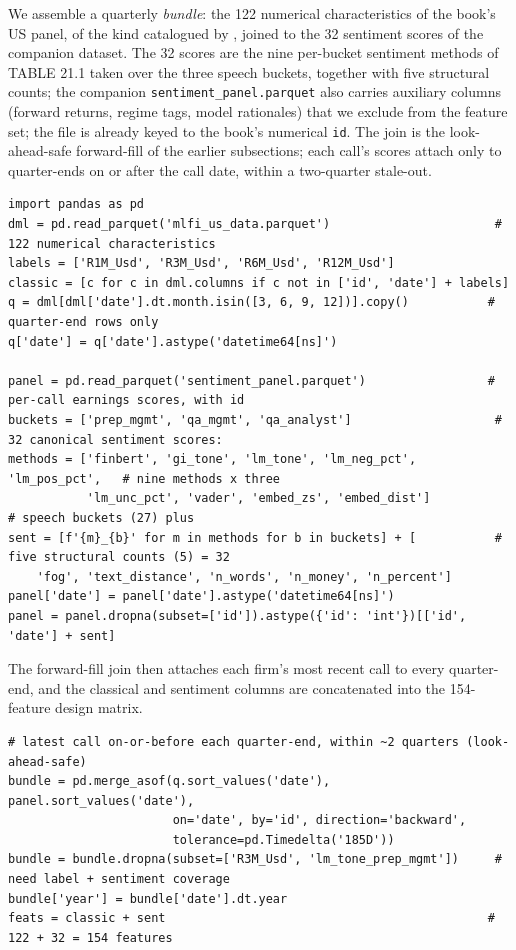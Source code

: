 We assemble a quarterly \textit{bundle}: the 122 numerical characteristics of the book's US panel, of the kind catalogued by \cite{chen2021open}, joined to the 32 sentiment scores of the companion dataset. The 32 scores are the nine per-bucket sentiment methods of TABLE 21.1 taken over the three speech buckets, together with five structural counts; the companion \texttt{sentiment\_panel.parquet} also carries auxiliary columns (forward returns, regime tags, model rationales) that we exclude from the feature set; the file is already keyed to the book's numerical \texttt{id}. The join is the look-ahead-safe forward-fill of the earlier subsections; each call's scores attach only to quarter-ends on or after the call date, within a two-quarter stale-out.

\begin{verbatim}
import pandas as pd
dml = pd.read_parquet('mlfi_us_data.parquet')                       # 122 numerical characteristics
labels = ['R1M_Usd', 'R3M_Usd', 'R6M_Usd', 'R12M_Usd']
classic = [c for c in dml.columns if c not in ['id', 'date'] + labels]
q = dml[dml['date'].dt.month.isin([3, 6, 9, 12])].copy()           # quarter-end rows only
q['date'] = q['date'].astype('datetime64[ns]')

panel = pd.read_parquet('sentiment_panel.parquet')                 # per-call earnings scores, with id
buckets = ['prep_mgmt', 'qa_mgmt', 'qa_analyst']                    # 32 canonical sentiment scores:
methods = ['finbert', 'gi_tone', 'lm_tone', 'lm_neg_pct', 'lm_pos_pct',   # nine methods x three
           'lm_unc_pct', 'vader', 'embed_zs', 'embed_dist']              # speech buckets (27) plus
sent = [f'{m}_{b}' for m in methods for b in buckets] + [           # five structural counts (5) = 32
    'fog', 'text_distance', 'n_words', 'n_money', 'n_percent']
panel['date'] = panel['date'].astype('datetime64[ns]')
panel = panel.dropna(subset=['id']).astype({'id': 'int'})[['id', 'date'] + sent]
\end{verbatim}

The forward-fill join then attaches each firm's most recent call to every quarter-end, and the classical and sentiment columns are concatenated into the 154-feature design matrix.

\begin{verbatim}
# latest call on-or-before each quarter-end, within ~2 quarters (look-ahead-safe)
bundle = pd.merge_asof(q.sort_values('date'), panel.sort_values('date'),
                       on='date', by='id', direction='backward',
                       tolerance=pd.Timedelta('185D'))
bundle = bundle.dropna(subset=['R3M_Usd', 'lm_tone_prep_mgmt'])     # need label + sentiment coverage
bundle['year'] = bundle['date'].dt.year
feats = classic + sent                                             # 122 + 32 = 154 features
\end{verbatim}

